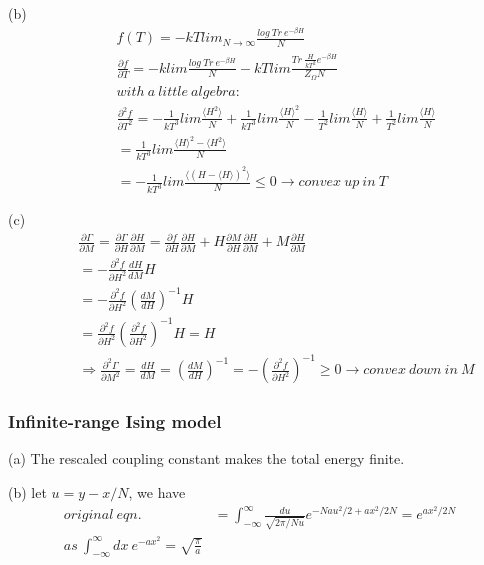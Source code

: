 \documentclass[12pt,titlepage]{article}
\numberwithin{equation}{section}
\begin{document}
(b)
\begin{align*}
&f( T) =-kTlim_{N\rightarrow \infty }\frac{log\ Tr\ e^{-\beta H}}{N}\\
&\frac{\partial f}{\partial T} =-klim\frac{log\ Tr\ e^{-\beta H}}{N} -kTlim\frac{Tr\ \frac{H}{kT^{2}} e^{-\beta H}}{Z_{\Omega } N}\\
&with\ a\ little\ algebra:\\
&\frac{\partial ^{2} f}{\partial T^{2}} =-\frac{1}{kT^{3}} lim\frac{\langle H^{2} \rangle }{N} +\frac{1}{kT^{3}} lim\frac{\langle H\rangle ^{2}}{N} -\frac{1}{T^{2}} lim\frac{\langle H\rangle }{N} +\frac{1}{T^{2}} lim\frac{\langle H\rangle }{N}\\
\ \ \ \ \ \ \ &=\frac{1}{kT^{3}} lim\frac{\langle H\rangle ^{2} -\langle H^{2} \rangle }{N}\\
\ \ \ \ \ \ \ &=-\frac{1}{kT^{3}} lim\frac{\langle ( H-\langle H\rangle )^{2} \rangle }{N} \leq 0\rightarrow convex\ up\ in\ T
\end{align*}

(c)
\begin{align*}
    &\frac{\partial \Gamma }{\partial M} =\frac{\partial \Gamma }{\partial H}\frac{\partial H}{\partial M}=\frac{\partial f}{\partial H}\frac{\partial H}{\partial M} +H\frac{\partial M}{\partial H}\frac{\partial H}{\partial M} +M\frac{\partial H}{\partial M}\\
\ \ \ \ \ \ &=-\frac{\partial ^{2} f}{\partial H^{2}}\frac{dH}{dM} H\\
\ \ \ \ \ \ \ &=-\frac{\partial ^{2} f}{\partial H^{2}}\left(\frac{dM}{dH}\right)^{-1} H\\
\ \ \ \ \ \ \ &=\frac{\partial ^{2} f}{\partial H^{2}}\left(\frac{\partial ^{2} f}{\partial H^{2}}\right)^{-1} H=H\\
&\Rightarrow \frac{\partial ^{2} \Gamma }{\partial M^{2}} =\frac{dH}{dM} =\left(\frac{dM}{dH}\right)^{-1}=-\left(\frac{\partial ^{2} f}{\partial H^{2}}\right)^{-1} \geq 0\rightarrow convex\ down\ in\ M
\end{align*}

\subsubsection{Infinite-range Ising model}
(a) The rescaled coupling constant makes the total energy finite.

(b) let $u=y-x/N$, we have
\begin{align*}
    original\ eqn.\ &=\int ^{\infty }_{-\infty }\frac{du}{\sqrt{2\pi /Nu}} e^{-Nau^{2} /2+ax^{2} /2N} =e^{ax^{2} /2N}\\
as\ \int ^{\infty }_{-\infty } dx\ e^{-ax^{2}} =\sqrt{\frac{\pi }{a}}
\end{align*}
\end{document}
